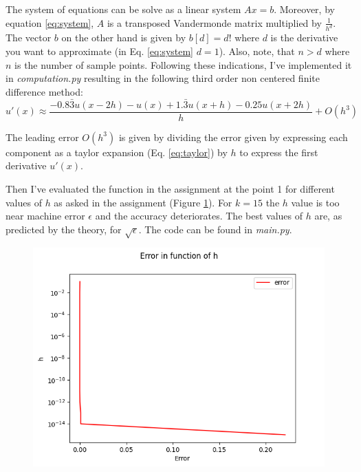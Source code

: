 \documentclass[12pt]{article}
\begin{document}
The system of equations can be solve as a linear system $Ax=b$. Moreover, by equation \ref{eq:system}, $A$ is a transposed Vandermonde matrix multiplied by $\frac{1}{h^d}$. The vector $b$ on the other hand is given by $b[d] = d!$ where $d$ is the derivative you want to approximate (in Eq. \ref{eq:system} $d=1$). Also, note, that $n>d$ where $n$ is the number of sample points. Following these indications, I've implemented it in \textit{computation.py} resulting in the following third order non centered finite difference method:\\

\begin{equation}
	u'(x) \approx \frac{-0.8\bar{3} u(x-2h) -u(x) + 1.\bar{3} u(x+h) - 0.25 u(x+2h)}{h}
	\label{eq:solution} + O(h^3)
\end{equation}

The leading error $O(h^3)$ is given by dividing the error given by expressing each component as a taylor expansion (Eq. \ref{eq:taylor}) by $h$ to express the first derivative $u'(x)$. 

Then I've evaluated the function in the assignment at the point 1 for different values of $h$ as asked in the assignment (Figure \ref{fig:error}). For $k=15$ the $h$ value is too near machine error $\epsilon$ and the accuracy deteriorates. The best values of $h$ are, as predicted by the theory, for $\sqrt{\epsilon}$.  The code can be found in \textit{main.py}. \\


\begin{figure}[H]
\centering
	\includegraphics[width = 0.8\columnwidth]{error_plot.png}
	\caption{}
	\label{fig:error}
\end{figure}
\end{document}
